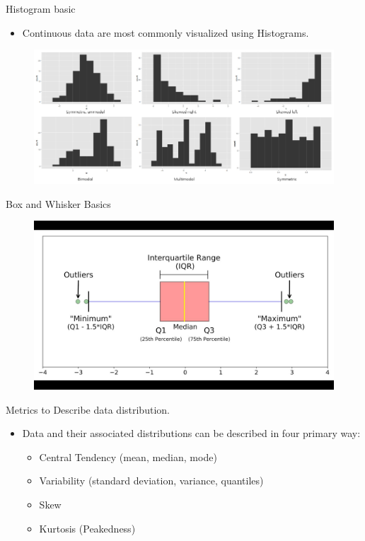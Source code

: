 \documentclass[
  ignorenonframetext,
]{beamer}
\providecommand{\tightlist}{%
  \setlength{\itemsep}{0pt}\setlength{\parskip}{0pt}}
\begin{document}
\begin{frame}{Histogram basic}
\label{histogram-basic}
\begin{itemize}
\tightlist
\item
  Continuous data are most commonly visualized using Histograms.
\end{itemize}

\begin{figure}
\includegraphics[width=0.8\linewidth]{fig/Histogram} \end{figure}
\end{frame}

\begin{frame}{Box and Whisker Basics}
\label{box-and-whisker-basics}
\begin{figure}
\includegraphics[width=0.8\linewidth]{fig/box} \end{figure}
\end{frame}

\begin{frame}{Metrics to Describe data distribution.}
\label{metrics-to-describe-data-distribution.}
\begin{itemize}
\item
  Data and their associated distributions can be described in four
  primary way:

  \begin{itemize}
  \tightlist
  \item
    Central Tendency (mean, median, mode)
  \item
    Variability (standard deviation, variance, quantiles)
  \item
    Skew
  \item
    Kurtosis (Peakedness)
  \end{itemize}
\end{itemize}
\end{frame}
\end{document}

